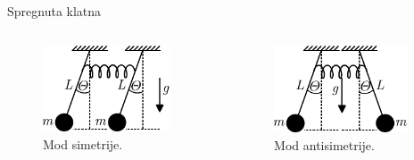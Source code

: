 \documentclass[aspectratio=169,xcolor=dvipsnames]{beamer}
\begin{document}

\begin{frame}{Spregnuta klatna}
    \begin{columns}[c]
    \begin{column}{.5\textwidth}
    \begin{figure}
        \centering
        \includegraphics[width=0.9\textwidth]{master_fig/spregnuto_klatno_1.pdf}
        \caption{Mod simetrije.}
    \end{figure}      
    \end{column}
    \begin{column}{.5\textwidth}
    \begin{figure}
        \centering
        \includegraphics[width=0.9\textwidth]{master_fig/spregnuto_klatno_2.pdf}
        \caption{Mod antisimetrije.}
    \end{figure}
    \end{column}
\end{columns}
\end{frame}
\end{document}
